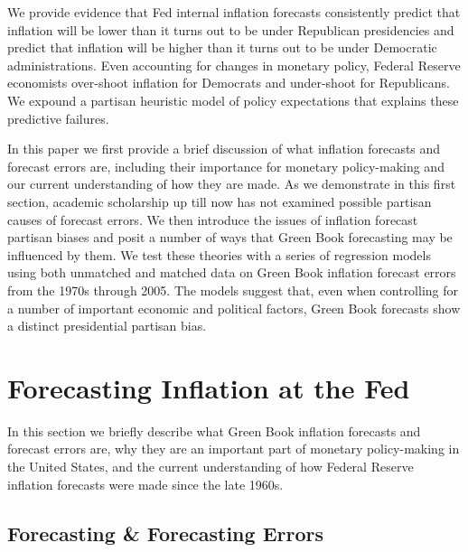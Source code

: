\documentclass[a4paper]{article}\usepackage{graphicx, color}
\begin{document}
We provide evidence that Fed internal inflation forecasts consistently predict that inflation will be lower than it turns out to be under Republican presidencies and predict that inflation will be higher than it turns out to be under Democratic administrations. Even accounting for changes in monetary policy, Federal Reserve economists over-shoot inflation for Democrats and under-shoot for Republicans. We expound a partisan heuristic model of policy expectations that explains these predictive failures.

In this paper we first provide a brief discussion of what inflation forecasts and forecast errors are, including their importance for monetary policy-making and our current understanding of how they are made. As we demonstrate in this first section, academic scholarship up till now has not examined possible partisan causes of forecast errors. We then introduce the issues of inflation forecast partisan biases and posit a number of ways that Green Book forecasting may be influenced by them. We test these theories with a series of regression models using both unmatched and matched data on Green Book inflation forecast errors from the 1970s through 2005. The models suggest that, even when controlling for a number of important economic and political factors, Green Book forecasts show a distinct presidential partisan bias. 


\section{Forecasting Inflation at the Fed}

In this section we briefly describe what Green Book inflation forecasts and forecast errors are, why they are an important part of monetary policy-making in the United States, and the current understanding of how Federal Reserve inflation forecasts were made since the late 1960s.

\subsection{Forecasting \& Forecasting Errors}
\end{document}
